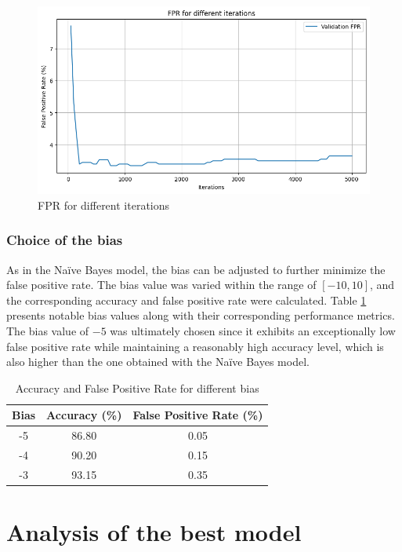 \documentclass{class}
\begin{document}
\begin{figure}[h]
    \centering
    \includegraphics[width=0.7\columnwidth]{images/fpr_logreg_iters.png}
    \caption{FPR for different iterations}
    \label{fig-10}
\end{figure}
\subsubsection*{Choice of the bias}
As in the Na\"ive Bayes model, the bias can be adjusted to further minimize the false positive rate.
The bias value was varied within the range of $[-10, 10]$, and the corresponding accuracy and false positive rate were calculated.
Table \ref{tab-3} presents notable bias values along with their corresponding performance metrics.
The bias value of $-5$ was ultimately chosen since it exhibits an exceptionally low false positive rate while maintaining a reasonably high accuracy level,
which is also higher than the one obtained with the Na\"ive Bayes model.

\begin{table}[H]
    \centering
    \begin{tabular}{|c|c|c|}
        \hline
        Bias & Accuracy (\%) & False Positive Rate (\%) \\
        \hline
        -5   & 86.80         & 0.05                     \\
        -4   & 90.20         & 0.15                     \\
        -3   & 93.15         & 0.35                     \\
        \hline
    \end{tabular}
    \caption{Accuracy and False Positive Rate for different bias}
    \label{tab-3}
\end{table}
\section{Analysis of the best model}
\end{document}
